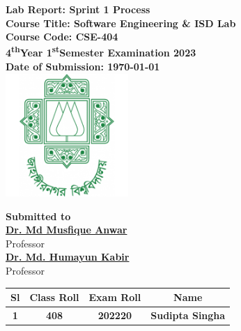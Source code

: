\documentclass[a4paper,12pt]{article}
\begin{document}
\begin{center}
    \vspace{0.2cm}
    \textbf{\large{Lab Report: Sprint 1 Process}}\\
    \vspace{0.2cm}
    \textbf{Course Title: Software Engineering \& ISD Lab}\\
    \vspace{0.2cm}
    \textbf{Course Code: CSE-404}\\
    \vspace{0.2cm}
    \textbf{4\textsuperscript{th}Year 1\textsuperscript{st}Semester Examination 2023}\\
    \vspace{0.5cm}
    \textbf{Date of Submission: \today}\\

    \vspace{1.5cm}
    \includegraphics[width=0.35\textwidth]{logo.png}\\ %
    \vspace{1cm}

    \textbf{Submitted to}\\
    \vspace{0.2cm}
    \textbf{\href{https://juniv.edu/teachers/musfique.anwar}{Dr. Md Musfique Anwar}}\\
    {Professor}\\
    \vspace{0.2cm}
    \textbf{\href{https://juniv.edu/teachers/hkabir}{Dr. Md. Humayun Kabir}}\\
    {Professor}\\


    \vspace{1cm}

    \begin{table}[h!]
        \centering
        \begin{tabular}{|c|c|c|c|}
            \hline
            \rowcolor[HTML]{2F4F4F} %
            {\color[HTML]{FFFFFF}\textbf{Sl}}& {\color[HTML]{FFFFFF}\textbf{Class Roll}}& {\color[HTML]{FFFFFF}\textbf{Exam Roll}}& {\color[HTML]{FFFFFF}\textbf{Name}}\\ \hline
            \rowcolor[HTML]{B0E0E6}
            \textbf{1}& \textbf{408} & \textbf{202220} & \textbf{Sudipta Singha} \\ \hline
       

\end{tabular}
\end{table}
\end{center}
\end{document}
